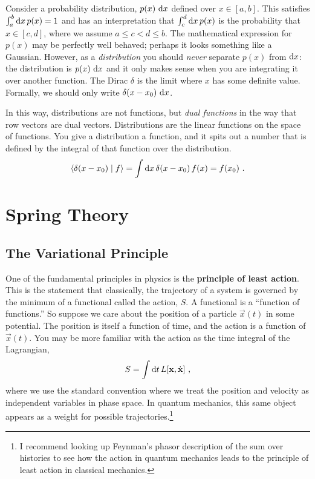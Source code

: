 \documentclass[12pt, oneside]{report}    %
\let\oldsection\section
\def\section{%
  \setcounter{sidenote}{1}%
  \oldsection
}
\begin{document}
\begin{subappendices}
Consider a probability distribution, $p(x)\,\operatorname{d}\!{x}$ defined over $x\in [a,b]$. This satisfies $\int_a^b \operatorname{d}\!{x}\, p(x) = 1$ and has an interpretation that
$
    \int_c^d \operatorname{d}\!{x}\, p(x)
$
is the probability that $x \in [c,d]$, where we assume $a\leq c < d \leq b$. The mathematical expression for $p(x)$ may be perfectly well behaved; perhaps it looks something like a Gaussian. However, as a \emph{distribution} you should \emph{never} separate $p(x)$ from $\operatorname{d}\!{x}$: the distribution is $p(x)\,\operatorname{d}\!{x}$ and it only makes sense when you are integrating it over another function. The Dirac $\delta$ is the limit where $x$ has some definite value. Formally, we should only write $\delta(x-x_0)\,\operatorname{d}\!{x}$.

In this way, distributions are not functions, but \emph{dual functions} in the way that row vectors are dual vectors. Distributions are the linear functions on the space of functions. You give a distribution a function, and it spits out a number that is defined by the integral of that function over the distribution. 
\begin{align}
    \langle \delta(x-x_0) \mid f \rangle = \int \operatorname{d}\!{x}\, \delta(x-x_0)\, f(x) = f(x_0) \ .
\end{align}






\end{subappendices}




\chapter{Spring Theory}

\section{The Variational Principle}
\label{eq:variational}

One of the fundamental principles in physics is the \textbf{principle of least action}. This is the statement that classically, the trajectory of a system is governed by the minimum of a functional called the action, $S$. A functional is a ``function of functions.'' So suppose we care about the position of a particle $\vec{x}(t)$ in some potential. The position is itself a function of time, and the action is a function of $\vec{x}(t)$. You may be more familiar with the action as the time integral of the Lagrangian,
\begin{align}
    S = \int \operatorname{d}\!{t}\, L[\mathbf{x}, \dot{\mathbf{x}}] \ ,
\end{align}
where we use the standard convention where we treat the position and velocity as independent variables in phase space. In quantum mechanics, this same object appears as a weight for possible trajectories.\footnote{I recommend looking up Feynman's phasor description of the sum over histories to see how the action in quantum mechanics leads to the principle of least action in classical mechanics.}
\end{document}
